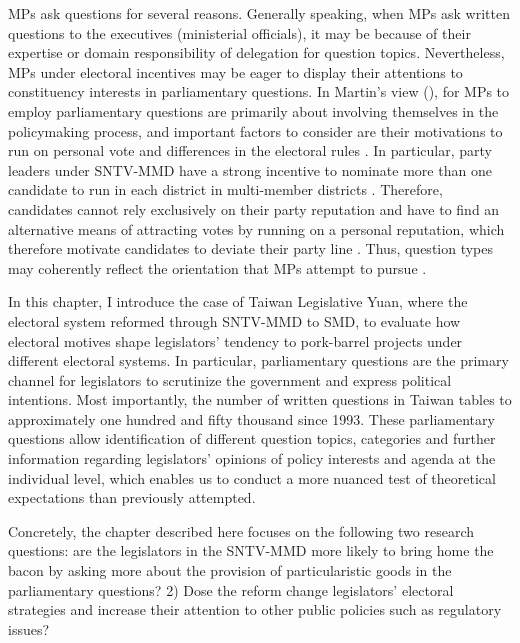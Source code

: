 MPs ask questions for several reasons. Generally speaking, when MPs ask written questions to the executives (ministerial officials), it may be because of their expertise or domain responsibility of delegation for question topics. Nevertheless, MPs under electoral incentives may be eager to display their attentions to constituency interests in parliamentary questions. In Martin's view (\cite{Martin2011}), for MPs to employ parliamentary questions are primarily about involving themselves in the policymaking process, and important factors to consider are their motivations to run on personal vote and differences in the electoral rules \citep[][p.260]{Martin2011}. In particular, party leaders under SNTV-MMD have a strong incentive to nominate more than one candidate to run in each district in multi-member districts \citep{Cain1987, Carey1995,Reed1995, Catalinac2017}. Therefore, candidates cannot rely exclusively on their party reputation and have to find an alternative means of attracting votes by running on a personal reputation, which therefore motivate candidates to deviate their party line \citep{Cain1987, Carey1995}. Thus, question types may coherently reflect the orientation that MPs attempt to pursue \citep{Saalfeld2011, Martin2011, Martin2017}.  

In this chapter, I introduce the case of Taiwan Legislative Yuan, where the electoral system reformed through SNTV-MMD to SMD, to evaluate how electoral motives shape legislators' tendency to pork-barrel projects under different electoral systems. In particular, parliamentary questions are the primary channel for legislators to scrutinize the government and express political intentions. Most importantly, the number of written questions in Taiwan tables to approximately one hundred and fifty thousand since 1993. These parliamentary questions allow identification of different question topics, categories and further information regarding legislators' opinions of policy interests and agenda at the individual level, which enables us to conduct a more nuanced test of theoretical expectations than previously attempted. 

Concretely, the chapter described here focuses on the following two research questions: are the legislators in the SNTV-MMD more likely to bring home the bacon by asking more about the provision of particularistic goods in the parliamentary questions? 2) Dose the reform change legislators' electoral strategies and increase their attention to other public policies such as regulatory issues? 


